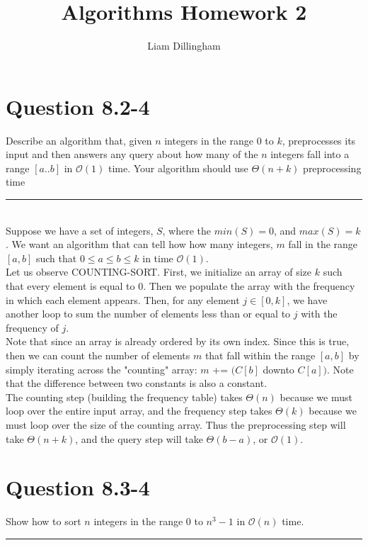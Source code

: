 \documentclass[20pt]{article} %
\title{Algorithms Homework 2}
\author{Liam Dillingham}
\begin{document}
\maketitle

\section{Question 8.2-4}
Describe an algorithm that, given $n$ integers in the range $0$ to $k$, preprocesses its input and then answers any query about how many of the $n$ integers fall into a range $[a..b]$ in $\mathcal{O}(1)$ time. Your algorithm should use $\Theta(n+k)$ preprocessing time \\ 
\noindent\rule{2cm}{0.4pt} \\ 

Suppose we have a set of integers, $S$, where the $min(S) = 0$, and $max(S) = k$.  We want an algorithm that can tell how how many integers, $m$ fall in the range $[a,b]$ such that 
$0 \leq a \leq b \leq k$ in time $\mathcal{O}(1)$. \\

Let us observe COUNTING-SORT.  First, we initialize an array of size $k$ such that every element is equal to $0$. Then we populate the array with the frequency in which each element appears.  Then, for any element $j \in [0,k]$, we have another loop to sum the number of elements less than or equal to $j$ with the frequency of $j$.  \\

Note that since an array is already ordered by its own index.  Since this is true, then we can count the number of elements $m$ that fall within the range $[a,b]$ by simply iterating across the "counting" array: $m$ += $(C[b]$ downto $C[a])$. Note that the difference between two constants is also a constant. \\

The counting step (building the frequency table) takes $\Theta(n)$ because we must loop over the entire input array, and the frequency step takes $\Theta(k)$ because we must loop over the size of the counting array.  Thus the preprocessing step will take $\Theta(n+k)$, and the query step will take $\Theta(b-a)$, or $\mathcal{O}(1)$.

\newpage
\section{Question 8.3-4}
Show how to sort $n$ integers in the range $0$ to $n^{3} -1$ in $\mathcal{O}(n)$ time. \\ 
\noindent\rule{2cm}{0.4pt} \\ 
\end{document}
